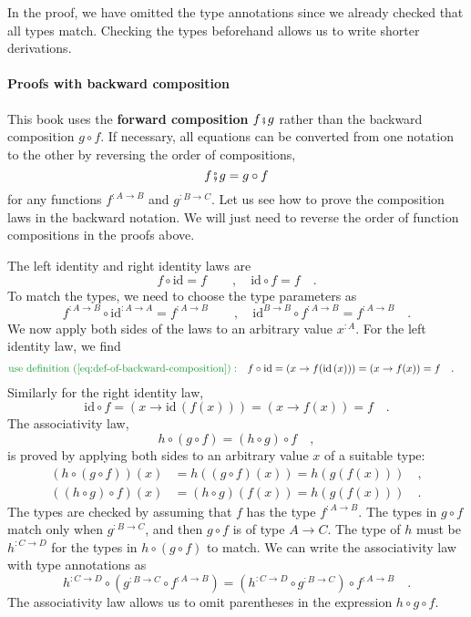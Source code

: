 In the proof, we have omitted the type annotations since we already
checked that all types match. Checking the types beforehand allows
us to write shorter derivations.

\paragraph{Proofs with backward composition}

This book uses the \textbf{forward composition}
$f\bef g$ rather than the backward composition
$g\circ f$. If necessary, all equations can be converted from one
notation to the other by reversing the order of compositions,
\[
f\bef g=g\circ f
\]
for any functions $f^{:A\rightarrow B}$ and $g^{:B\rightarrow C}$.
Let us see how to prove the composition laws in the backward notation.
We will just need to reverse the order of function compositions in
the proofs above.

The left identity and right identity laws are
\[
f\circ\text{id}=f\quad\quad,\quad\text{id}\circ f=f\quad.
\]
To match the types, we need to choose the type parameters as
\[
f^{:A\rightarrow B}\circ\text{id}^{:A\rightarrow A}=f^{:A\rightarrow B}\quad\quad,\quad\text{id}^{B\rightarrow B}\circ f^{:A\rightarrow B}=f^{:A\rightarrow B}\quad.
\]
We now apply both sides of the laws to an arbitrary value $x^{:A}$.
For the left identity law, we find
\begin{align*}
{\color{greenunder}\text{use definition~(\ref{eq:def-of-backward-composition})}:}\quad & f\circ\text{id}=\left(x\rightarrow f(\text{id}\,(x))\right)=\left(x\rightarrow f(x)\right)=f\quad.
\end{align*}
Similarly for the right identity law,
\[
\text{id}\circ f=\left(x\rightarrow\text{id}\,(f(x))\right)=\left(x\rightarrow f\left(x\right)\right)=f\quad.
\]
The associativity law,
\[
h\circ\left(g\circ f\right)=\left(h\circ g\right)\circ f\quad,
\]
is proved by applying both sides to an arbitrary value $x$ of a suitable
type:
\begin{align*}
\left(h\circ\left(g\circ f\right)\right)(x) & =h\left(\left(g\circ f\right)(x)\right)=h\left(g\left(f\left(x\right)\right)\right)\quad,\\
\left(\left(h\circ g\right)\circ f\right)(x) & =\left(h\circ g\right)\left(f(x)\right)=h\left(g\left(f\left(x\right)\right)\right)\quad.
\end{align*}
The types are checked by assuming that $f$ has the type $f^{:A\rightarrow B}$.
The types in $g\circ f$ match only when $g^{:B\rightarrow C}$, and
then $g\circ f$ is of type $A\rightarrow C$. The type of $h$ must
be $h^{:C\rightarrow D}$ for the types in $h\circ\left(g\circ f\right)$
to match. We can write the associativity law with type annotations
as
\begin{equation}
h^{:C\rightarrow D}\circ(g^{:B\rightarrow C}\circ f^{:A\rightarrow B})=(h^{:C\rightarrow D}\circ g^{:B\rightarrow C})\circ f^{:A\rightarrow B}\quad.\label{eq:assoc-law-for-composition-with-types-backward}
\end{equation}
The associativity law allows us to omit parentheses in the expression
$h\circ g\circ f$. 

